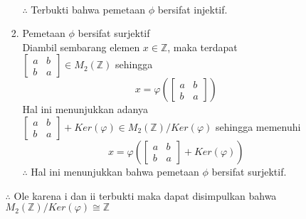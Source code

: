 \documentclass[12pt,A4paper]{article}
\begin{document}
\begin{enumerate}
\begin{enumerate}
\begin{enumerate}
\\ $\therefore$ Terbukti bahwa pemetaan $\phi$ bersifat injektif.
\item Pemetaan $\phi$ bersifat surjektif
\\ Diambil sembarang elemen $x \in \mathbb{Z}$, maka terdapat $\begin{bmatrix}
	a & b\\
	b & a
\end{bmatrix} \in M_2(\mathbb{Z})$ sehingga 
\[x = \varphi\left(\begin{bmatrix}
	a & b\\
	b & a
\end{bmatrix}\right)\]
Hal ini menunjukkan adanya $\begin{bmatrix}
	a & b\\
	b & a
\end{bmatrix} + Ker(\varphi) \in M_2(\mathbb{Z})/Ker(\varphi)$ sehingga memenuhi \[x = \varphi\left(\begin{bmatrix}
a & b\\
b & a
\end{bmatrix} + Ker(\varphi)\right)\]
$\therefore$ Hal ini menunjukkan bahwa pemetaan $\phi$ bersifat surjektif. 
\end{enumerate}
$\therefore$ Ole karena i dan ii terbukti maka dapat disimpulkan bahwa $M_2(\mathbb{Z})/Ker(\varphi) \cong \mathbb{Z}$
\end{enumerate}
\end{enumerate}
\end{document}

